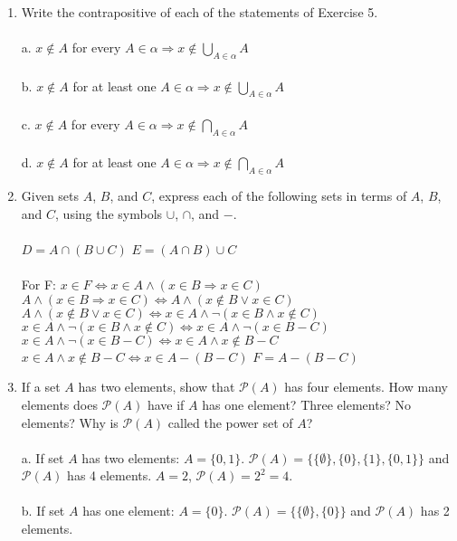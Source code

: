 \documentclass[]{article}
\begin{document}
\begin{enumerate}
    \item Write the contrapositive of each of the statements of Exercise 5.
    \\\\ a. $x \notin A$ for every $A \in \alpha \Rightarrow x \notin \bigcup_{A \in \alpha}A$
    \\\\ b. $x \notin A$ for at least one $A \in \alpha \Rightarrow x \notin \bigcup_{A \in \alpha}A$
    \\\\ c. $x \notin A$ for every $A \in \alpha \Rightarrow x \notin \bigcap_{A \in \alpha}A$
    \\\\ d. $x \notin A$ for at least one $A \in \alpha \Rightarrow x \notin \bigcap_{A \in 
    \alpha}A$
    
    \item Given sets $A$, $B$, and $C$, express each of the following sets in terms of $A$, $B$, and $C$, using the symbols $\cup$, $\cap$, and $-$.
    \\\\ $D=A \cap (B \cup C)$
    \newline $E=(A \cap B) \cup C$
    \\\\ For F:
    \newline $x \in F \iff x \in A \land (x \in B \Rightarrow x \in C)$
    \newline $A \land (x \in B \Rightarrow x \in C) \iff A \land (x \notin B \lor x \in C)$
    \newline $A \land (x \notin B \lor x \in C) \iff x \in A \land \neg(x \in B \land x \notin C)$
    \newline $x \in A \land \neg(x \in B \land x \notin C) \iff x \in A \land \neg (x \in B - C)$
    \newline $x \in A \land \neg (x \in B - C) \iff x \in A \land x \notin B - C$
    \newline $x \in A \land x \notin B - C \iff x \in A - (B-C)$
    \newline $F = A-(B-C)$
    
    \item If a set $A$ has two elements, show that $\mathcal{P}(A)$ has four elements. How many elements does $\mathcal{P}(A)$ have if $A$ has one element? Three elements? No elements? Why is $\mathcal{P}(A)$ called the power set of $A$?
    \\\\a. If set $A$ has two elements: $A = \{0,1\}$. $\mathcal{P}(A) = \{\{ \emptyset \},\{0\},\{1\},\{0,1\}\}$ and $\mathcal{P}(A)$ has 4 elements. $A=2$, $\mathcal{P}(A)=2^2=4$.
    \\\\b. If set $A$ has one element: $A = \{0\}$. $\mathcal{P}(A) = \{\{ \emptyset \},\{0\}\}$ and $\mathcal{P}(A)$ has 2 elements. 
    

\end{enumerate}
\end{document}
